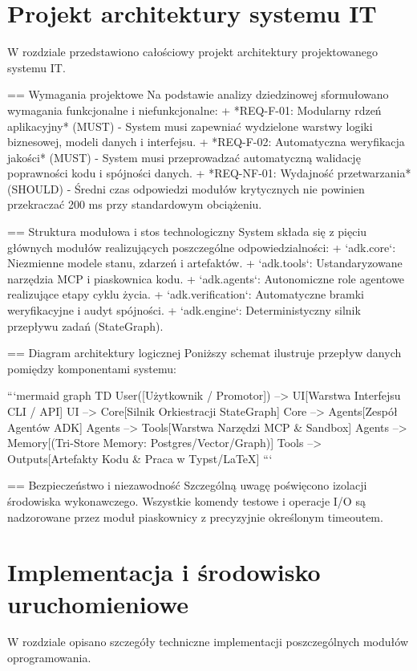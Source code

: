 \documentclass[12pt,a4paper,twoside]{report}
\begin{document}
\chapter{Projekt architektury systemu IT}

W rozdziale przedstawiono całościowy projekt architektury projektowanego systemu IT.

== Wymagania projektowe
Na podstawie analizy dziedzinowej sformułowano wymagania funkcjonalne i niefunkcjonalne:
+ *REQ-F-01: Modularny rdzeń aplikacyjny* (MUST) - System musi zapewniać wydzielone warstwy logiki biznesowej, modeli danych i interfejsu.
+ *REQ-F-02: Automatyczna weryfikacja jakości* (MUST) - System musi przeprowadzać automatyczną walidację poprawności kodu i spójności danych.
+ *REQ-NF-01: Wydajność przetwarzania* (SHOULD) - Średni czas odpowiedzi modułów krytycznych nie powinien przekraczać 200 ms przy standardowym obciążeniu.

== Struktura modułowa i stos technologiczny
System składa się z pięciu głównych modułów realizujących poszczególne odpowiedzialności:
+ `adk.core`: Niezmienne modele stanu, zdarzeń i artefaktów.
+ `adk.tools`: Ustandaryzowane narzędzia MCP i piaskownica kodu.
+ `adk.agents`: Autonomiczne role agentowe realizujące etapy cyklu życia.
+ `adk.verification`: Automatyczne bramki weryfikacyjne i audyt spójności.
+ `adk.engine`: Deterministyczny silnik przepływu zadań (StateGraph).

== Diagram architektury logicznej
Poniższy schemat ilustruje przepływ danych pomiędzy komponentami systemu:

```mermaid
graph TD
  User([Użytkownik / Promotor]) --> UI[Warstwa Interfejsu CLI / API]
  UI --> Core[Silnik Orkiestracji StateGraph]
  Core --> Agents[Zespół Agentów ADK]
  Agents --> Tools[Warstwa Narzędzi MCP & Sandbox]
  Agents --> Memory[(Tri-Store Memory: Postgres/Vector/Graph)]
  Tools --> Outputs[Artefakty Kodu & Praca w Typst/LaTeX]
```

== Bezpieczeństwo i niezawodność
Szczególną uwagę poświęcono izolacji środowiska wykonawczego. Wszystkie komendy testowe i operacje I/O są nadzorowane przez moduł piaskownicy z precyzyjnie określonym timeoutem.


\chapter{Implementacja i środowisko uruchomieniowe}

W rozdziale opisano szczegóły techniczne implementacji poszczególnych modułów oprogramowania.
\end{document}
